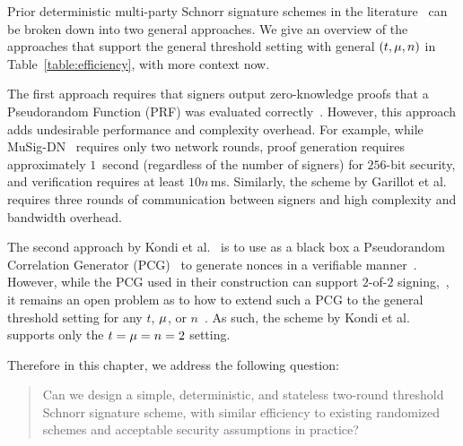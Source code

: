 Prior deterministic multi-party Schnorr signature schemes in the literature~\cite{NickRSW20,GarillotKMN21,KondiOR23}
can be broken down into two general approaches.
We give an overview of the approaches that support the general threshold setting with general $(t, \mu, n)$ in Table~\ref{table:efficiency},
with more context now.

The first approach requires that signers output zero-knowledge proofs that a Pseudorandom Function (PRF) was evaluated correctly~\cite{NickRSW20,GarillotKMN21}.
However,
this approach adds undesirable performance and complexity overhead.
For example,
while MuSig-DN~\cite{NickRSW20} requires only two network rounds,
proof generation requires approximately $1$~second (regardless of the number of signers) for $256$-bit security,
and verification requires at least $10n$\,ms.
Similarly,
the scheme by Garillot et al.~\cite{GarillotKMN21}
requires three rounds of communication between signers and high complexity and bandwidth overhead.

The second approach  by Kondi et al.~\cite{KondiOR23} is to use as a black box a Pseudorandom Correlation Generator (PCG)~\cite{BoyleCGIKS20}  to generate nonces in a verifiable manner~\cite{KondiOR23}.
However, while the PCG used in their construction can support $2$-of-$2$ signing,~\cite{OrlandiSY21,KondiOR23},
it remains an open problem as to how to extend such a PCG to the general threshold setting for any $t$, $\mu$,  or $n$~\cite{KPC24}.
As such,
the scheme by Kondi et al.~\cite{KondiOR23} supports only the $t=\mu=n=2$ setting.

Therefore
in this chapter,
we address the following question:

\begin{quote}
  \it
  \begin{sloppypar}
Can we design a simple, deterministic, and stateless
two-round threshold Schnorr signature scheme,
with similar efficiency to existing randomized schemes
and acceptable security assumptions in practice?
  \end{sloppypar}
\end{quote}

